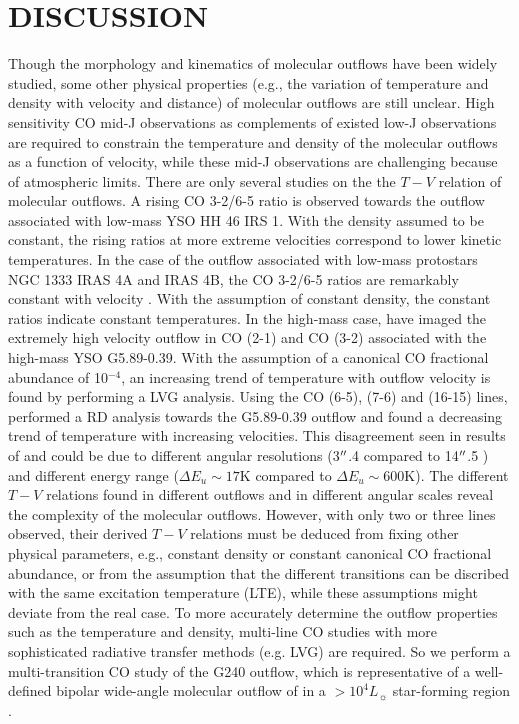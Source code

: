 \section{DISCUSSION}\label{discussion}

Though the morphology and kinematics of molecular outflows have been widely studied, some other physical properties (e.g., the variation of temperature and density with velocity and distance) of molecular outflows are still unclear. High sensitivity CO mid-J observations as complements of existed low-J observations are required to constrain the temperature and density of the molecular outflows as a function of velocity, while these mid-J observations are challenging because of atmospheric limits. There are only several studies on the the $T-V$ relation of molecular outflows. A rising CO 3-2/6-5 ratio is observed towards the outflow associated with low-mass YSO HH 46 IRS 1\citep{2009A&A...501..633V}. With the density assumed to be constant, the rising ratios at more extreme velocities correspond to lower kinetic temperatures. In the case of the outflow associated with low-mass protostars NGC 1333 IRAS 4A and  IRAS 4B, the CO 3-2/6-5 ratios are remarkably constant with velocity \citep{2012A&A...542A..86Y}. With the assumption of constant density, the constant ratios indicate constant temperatures. In the high-mass case, \citet{2012ApJ...744L..26S} have imaged the extremely high velocity outflow in CO (2-1) and CO (3-2) associated with the high-mass YSO G5.89-0.39. With the assumption of a canonical CO fractional abundance of 10$^{-4}$, an increasing trend of temperature with outflow velocity is found by performing a LVG analysis. Using the CO (6-5), (7-6) and (16-15) lines, \citet{2015A&A...584A..70L} performed a RD analysis towards the G5.89-0.39 outflow and found a decreasing trend of temperature with increasing velocities. This disagreement seen in results of \citet{2012ApJ...744L..26S} and \citet{2015A&A...584A..70L} could be due to different angular resolutions (3${\mbox{$^{\prime\prime}$}}$.4 compared to 14${\mbox{$^{\prime\prime}$}}$.5 ) and different energy range ($\Delta E_u \sim 17 $K compared to $\Delta E_u \sim 600 $K). The different $T-V$ relations found in different outflows and in different angular scales reveal the complexity of the molecular outflows. However, with only two or three lines observed, their derived $T-V$ relations must be deduced from fixing other physical parameters, e.g., constant density or constant canonical CO fractional abundance, or from the assumption that the different transitions can be discribed with the same excitation temperature (LTE), while these assumptions might deviate from the real case. To  more accurately determine the outflow properties such as the temperature and density, multi-line CO studies with more sophisticated radiative transfer methods (e.g. LVG) are required. So we perform a multi-transition CO study of the G240 outflow, which is representative of a well-defined bipolar wide-angle molecular outflow of in a $> 10^4 L_\sun$ star-forming region \citep{2009ApJ...696...66Q}.

